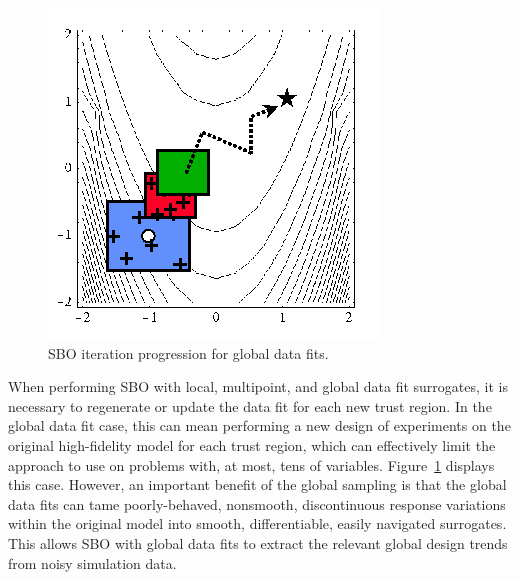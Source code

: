\begin{figure}
  \centering
  \includegraphics[width=.3\textwidth]{images/sbo_df}
  \caption{SBO iteration progression for global data fits.}
  \label{fig:sbo_df}
\end{figure}
When performing SBO with local, multipoint, and global data fit
surrogates, it is necessary to regenerate or update the data fit for
each new trust region.  In the global data fit case, this can mean
performing a new design of experiments on the original high-fidelity
model for each trust region, which can effectively limit the approach
to use on problems with, at most, tens of variables.
Figure~\ref{fig:sbo_df} displays this case.  However, an important
benefit of the global sampling is that the global data fits can tame
poorly-behaved, nonsmooth, discontinuous response variations within
the original model into smooth, differentiable, easily navigated
surrogates.  This allows SBO with global data fits to extract the
relevant global design trends from noisy simulation data.

